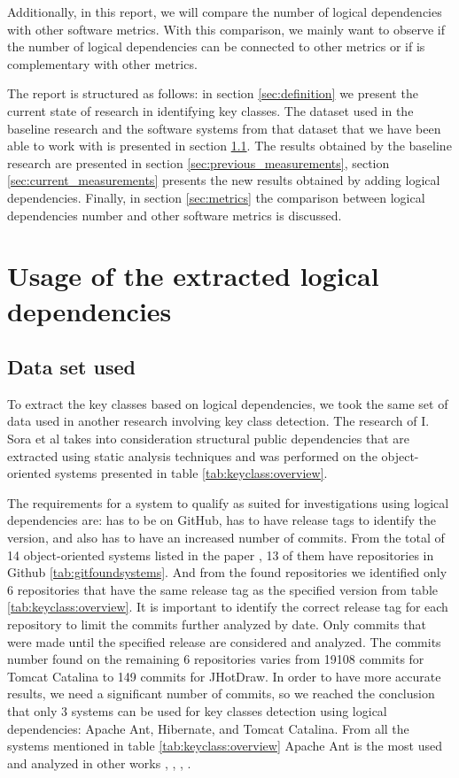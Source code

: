 \documentclass[12pt]{mitthesis}
\begin{document}
Additionally, in this report, we will compare the number of logical dependencies with other software metrics. With this comparison, we mainly want to observe if the number of logical dependencies can be connected to other metrics or if is complementary with other metrics.

The report is structured as follows: in section \ref{sec:definition} we present the current state of research in identifying key classes. The dataset used in the baseline research and the software systems from that dataset that we have been able to work with is presented in section \ref{sec:dataset}.  The results obtained by the baseline research are presented in section \ref{sec:previous_measurements}, section \ref{sec:current_measurements} presents the new results obtained by adding logical dependencies.
Finally, in section \ref{sec:metrics} the comparison between logical dependencies number and other software metrics is discussed. 


\chapter{Usage of the extracted logical dependencies}
\section{Data set used}
\label{sec:dataset}
To extract the key classes based on logical dependencies, we took the same set of data used in another research involving key class detection. The research of I. Sora et al \cite{Finding-key-classes} takes into consideration structural public dependencies that are extracted using static analysis techniques and was performed on the object-oriented systems presented in table \ref{tab:keyclass:overview}.

The requirements for a system to qualify as suited for investigations using logical dependencies are: has to be on GitHub, has to have release tags to identify the version, and also has to have an increased number of commits. 
From the total of 14 object-oriented systems listed in the paper \cite{Finding-key-classes}, 13 of them have repositories in Github \ref{tab:gitfoundsystems}. And from the found repositories we identified only 6 repositories that have the same release tag as the specified version from table \ref{tab:keyclass:overview}. It is important to identify the correct release tag for each repository to limit the commits further analyzed by date. Only commits that were made until the specified release are considered and analyzed.
The commits number found on the remaining 6 repositories varies from 19108 commits for Tomcat Catalina to 149 commits for JHotDraw. In order to have more accurate results, we need a significant number of commits, so we reached the conclusion that only 3 systems can be used for key classes detection using logical dependencies: Apache Ant, Hibernate, and Tomcat Catalina.  From all the systems mentioned in table \ref{tab:keyclass:overview} Apache Ant is the most used and analyzed in other  works \cite{enase19}, \cite{7332515}, \cite{1402122}, \cite{Kamran2016IdentificationOC}.
\end{document}
